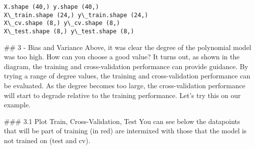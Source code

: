 \documentclass[11pt]{article}
\begin{document}
    \begin{Verbatim}[commandchars=\\\{\}]
X.shape (40,) y.shape (40,)
X\_train.shape (24,) y\_train.shape (24,)
X\_cv.shape (8,) y\_cv.shape (8,)
X\_test.shape (8,) y\_test.shape (8,)
    \end{Verbatim}

    \#\# 3 - Bias and Variance Above, it was clear the degree of the
polynomial model was too high. How can you choose a good value? It turns
out, as shown in the diagram, the training and cross-validation
performance can provide guidance. By trying a range of degree values,
the training and cross-validation performance can be evaluated. As the
degree becomes too large, the cross-validation performance will start to
degrade relative to the training performance. Let's try this on our
example.

    \#\#\# 3.1 Plot Train, Cross-Validation, Test You can see below the
datapoints that will be part of training (in red) are intermixed with
those that the model is not trained on (test and cv).
\end{document}
